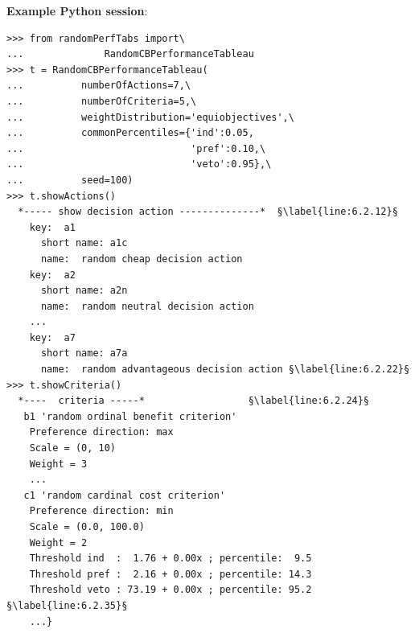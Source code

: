\noindent \textbf{Example Python session}:
\begin{lstlisting}[caption={Generating a random Cost-Benefit performance tableau},label=list:6.2]
>>> from randomPerfTabs import\
...              RandomCBPerformanceTableau
>>> t = RandomCBPerformanceTableau(
...          numberOfActions=7,\
...          numberOfCriteria=5,\
...          weightDistribution='equiobjectives',\
...          commonPercentiles={'ind':0.05,
...                             'pref':0.10,\
...                             'veto':0.95},\
...          seed=100)                             
>>> t.showActions()
  *----- show decision action --------------*  §\label{line:6.2.12}§
    key:  a1
      short name: a1c
      name:  random cheap decision action
    key:  a2
      short name: a2n
      name:  random neutral decision action
    ...
    key:  a7
      short name: a7a
      name:  random advantageous decision action §\label{line:6.2.22}§
>>> t.showCriteria()
  *----  criteria -----*                  §\label{line:6.2.24}§
   b1 'random ordinal benefit criterion' 
    Preference direction: max
    Scale = (0, 10)
    Weight = 3
    ...
   c1 'random cardinal cost criterion'
    Preference direction: min
    Scale = (0.0, 100.0)
    Weight = 2 
    Threshold ind  :  1.76 + 0.00x ; percentile:  9.5
    Threshold pref :  2.16 + 0.00x ; percentile: 14.3
    Threshold veto : 73.19 + 0.00x ; percentile: 95.2  §\label{line:6.2.35}§
    ...}
\end{lstlisting}


